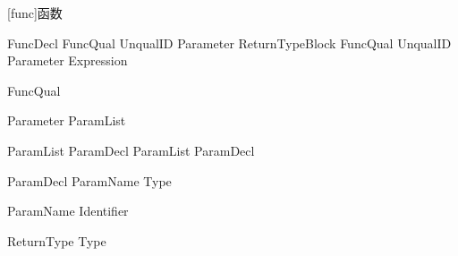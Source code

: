 
[func]{函数}

\begin{bnf}{FuncDecl}
    FuncQual\bnfs {} UnqualID Parameter ReturnType\bnfq Block \br
    FuncQual\bnfs {} UnqualID Parameter \terminal{=>} Expression \terminal{;}
\end{bnf}

\begin{bnf}{FuncQual}
     \br
     \br
\end{bnf}

\begin{bnf}{Parameter}
    \terminal{(} ParamList\bnfq \terminal{)}
\end{bnf}

\begin{bnf}{ParamList}
    ParamDecl \br
    ParamList \terminal{,} ParamDecl
\end{bnf}

\begin{bnf}{ParamDecl}
    ParamName \terminal{:} Type\bnfq
\end{bnf}

\begin{bnf}{ParamName}
    Identifier \br
\end{bnf}

\begin{bnf}{ReturnType}
    \terminal{->} Type
\end{bnf}